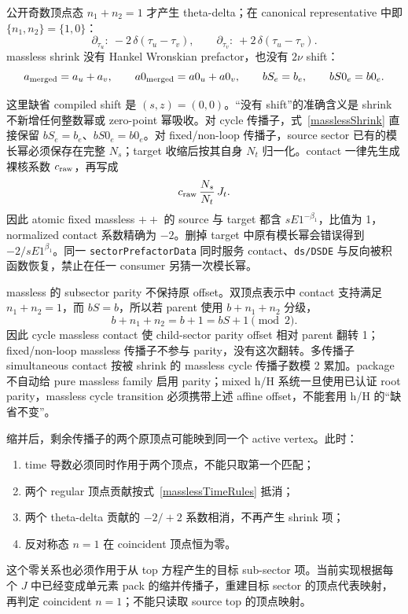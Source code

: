 ﻿\documentclass[a4paper,11pt]{article}
\begin{document}
公开奇数顶点态 $n_1+n_2=1$ 才产生 theta-delta；在 canonical representative 中即 $\{n_1,n_2\}=\{1,0\}$：
\begin{equation}
 \partial_{\tau_u}:\ -2\,\delta(\tau_u-\tau_v),
 \qquad
 \partial_{\tau_v}:\ +2\,\delta(\tau_u-\tau_v).
 \label{masslessDeltaSigns}
\end{equation}
massless shrink 没有 Hankel Wronskian prefactor，也没有 $2\nu$ shift：
\begin{equation}
 a_{\rm merged}=a_u+a_v,\qquad
 a0_{\rm merged}=a0_u+a0_v,\qquad
 bS_e=b_e,\qquad bS0_e=b0_e.
 \label{masslessShrink}
\end{equation}

这里缺省 compiled shift 是 $(s,z)=(0,0)$。“没有 shift”的准确含义是 shrink 不新增任何整数幂或 zero-point 幂吸收。对 cycle 传播子，式~\eqref{masslessShrink} 直接保留 $bS_e=b_e$、$bS0_e=b0_e$。对 fixed/non-loop 传播子，source sector 已有的模长幂必须保存在完整 $N_s$；target 收缩后按其自身 $N_t$ 归一化。contact 一律先生成裸核系数 $c_{\rm raw}$，再写成
\begin{equation}
 c_{\rm raw}\,\frac{N_s}{N_t}\,J_t.
\end{equation}
因此 atomic fixed massless $++$ 的 source 与 target 都含 $sE1^{-\beta_1}$，比值为 1，normalized contact 系数精确为 $-2$。删掉 target 中原有模长幂会错误得到 $-2/sE1^{\beta_1}$。同一 \texttt{sectorPrefactorData} 同时服务 contact、\texttt{ds/DSDE} 与反向被积函数恢复，禁止在任一 consumer 另猜一次模长幂。

massless 的 subsector parity 不保持原 offset。双顶点表示中 contact 支持满足 $n_1+n_2=1$，而 $bS=b$，所以若 parent 使用 $b+n_1+n_2$ 分级，
\begin{equation}
 b+n_1+n_2=b+1=bS+1\pmod 2.
 \label{manualMasslessContactParity}
\end{equation}
因此 cycle massless contact 使 child-sector parity offset 相对 parent 翻转 1；fixed/non-loop massless 传播子不参与 parity，没有这次翻转。多传播子 simultaneous contact 按被 shrink 的 massless cycle 传播子数模 2 累加。package 不自动给 pure massless family 启用 parity；mixed h/H 系统一旦使用已认证 root parity，massless cycle transition 必须携带上述 affine offset，不能套用 h/H 的“缺省不变”。

缩并后，剩余传播子的两个原顶点可能映到同一个 active vertex。此时：
\begin{enumerate}
  \item time 导数必须同时作用于两个顶点，不能只取第一个匹配；
  \item 两个 regular 顶点贡献按式~\eqref{masslessTimeRules} 抵消；
  \item 两个 theta-delta 贡献的 $-2/+2$ 系数相消，不再产生 shrink 项；
  \item 反对称态 $n=1$ 在 coincident 顶点恒为零。
\end{enumerate}
这个零关系也必须作用于从 top 方程产生的目标 sub-sector 项。当前实现根据每个 $J$ 中已经变成单元素 pack 的缩并传播子，重建目标 sector 的顶点代表映射，再判定 coincident $n=1$；不能只读取 source top 的顶点映射。
\end{document}
